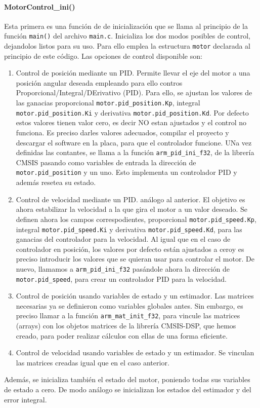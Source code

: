 \paragraph{MotorControl\_ini()}
Esta primera es una función de de inicialización que se llama al principio de la función \texttt{main()} del archivo \texttt{main.c}. Inicializa los dos modos posibles de control, dejandolos listos para su uso. Para ello emplea la estructura \texttt{motor} declarada al principio de este código.
Las opciones de control disponible son:
\begin{enumerate}
    \item Control de posición mediante un PID. Permite llevar el eje del motor a una posición angular deseada empleando para ello contros Proporcional/Integral/DErivativo (PID). Para ello, se ajustan los valores de las ganacias proporcional \texttt{motor.pid\_position.Kp}, integral \texttt{motor.pid\_position.Ki} y derivativa \texttt{motor.pid\_position.Kd}. Por defecto estos valores tienen valor cero, es decir NO estan ajustados y el control no funciona. Es preciso darles valores adecuados, compilar el proyecto y descargar el software en la placa, para que el controlador funcione.
    UNa vez definidas las contantes, se llama a la función \texttt{arm\_pid\_ini\_f32}, de la librería CMSIS pasando como variables de entrada la dirección de \texttt{motor.pid\_position} y un uno. Esto implementa un controlador PID y además resetea su estado.
    \item Control de velocidad mediante un PID. análogo al anterior. El objetivo es ahora estabilizar la velocidad a la que gira el motor a un valor deseado. Se definen ahora los campos correspodientes, proporcional \texttt{motor.pid\_speed.Kp}, integral \texttt{motor.pid\_speed.Ki} y derivativa \texttt{motor.pid\_speed.Kd}, para las ganacias del controlador para la velocidad. Al igual que en el caso de controlador en posición, los valores por defecto están ajustados a ceroy es preciso introducir los valores que se quieran usar para controlar el motor.
    De nuevo, llamamos a \texttt{arm\_pid\_ini\_f32} pasándole ahora la dirección de \texttt{motor.pid\_speed}, para crear un controlador PID para la velocidad.

\item Control de posición usando variables de estado y un estimador. Las matrices necesarias ya se definieron como variables globales antes. Sin embargo, es preciso llamar a la función \texttt{arm\_mat\_init\_f32}, para vincule las matrices (arrays) con los objetos matrices de la librería CMSIS-DSP, que hemos creado, para  poder realizar cálculos con ellas de una forma eficiente. 
\item Control de velocidad usando variables de estado y un estimador. Se vinculan las matrices creadas igual que en el caso anterior.
\end{enumerate}
Además, se inicializa también el estado del motor, poniendo todas sus variables de estado a cero. De modo análogo se inicializan los estados del estimador y del error integral.

